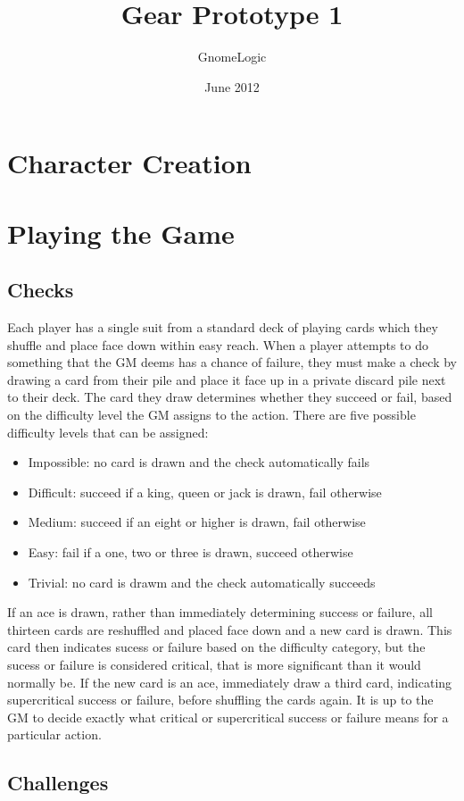 \documentclass{report}
\begin{document}
\title{Gear Prototype 1}
\author{GnomeLogic}
\date{June 2012}
\maketitle

\chapter{Character Creation}

\chapter{Playing the Game}
\section{Checks}
Each player has a single suit from a standard deck of playing cards which they shuffle and place face down within easy
reach. When a player attempts to do something that the GM deems has a chance of failure, they must make a check by drawing
a card from their pile and place it face up in a private discard pile next to their deck. The card they draw determines
whether they succeed or fail, based on the difficulty level the GM assigns to the action. There are five possible
difficulty levels that can be assigned:
\begin{itemize}
  \item Impossible: no card is drawn and the check automatically fails
  \item Difficult: succeed if a king, queen or jack is drawn, fail otherwise
  \item Medium: succeed if an eight or higher is drawn, fail otherwise
  \item Easy: fail if a one, two or three is drawn, succeed otherwise
  \item Trivial: no card is drawm and the check automatically succeeds
\end{itemize}

If an ace is drawn, rather than immediately determining success or failure, all thirteen cards are reshuffled and placed
face down and a new card is drawn. This card then indicates sucess or failure based on the difficulty category, but the
sucess or failure is considered critical, that is more significant than it would normally be. If the new card is an ace,
immediately draw a third card, indicating supercritical success or failure, before shuffling the cards again. It is up to
the GM to decide exactly what critical or supercritical success or failure means for a particular action.
\section{Challenges}
\end{document}
